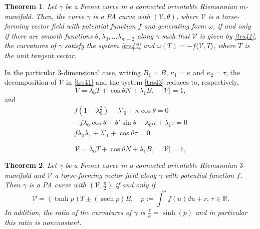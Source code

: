 \documentclass[10pt,a4paper]{amsart}
\newtheorem{theorem}{Theorem}
\def\r{\mathbb R}
\DeclareMathOperator{\sech}{sech}
\def\v{\mathcal V}
\begin{document}
\begin{theorem}\label{prop41}
Let $\gamma $ be a Frenet curve in a connected orientable Riemannian $m$-manifold. Then, the curve $\gamma$ is a PA curve with $(\v,\theta)$, where $\v$ is a torse-forming vector field with potential function $f$ and generating form $\omega$, if and only if there are smooth functions $\theta,\lambda_0,\ldots\lambda_{m-2}$ along $\gamma$ such that $\v$ is given by \eqref{trs41}, the curvatures of $\gamma$ satisfy the system \eqref{trs43} and $\omega(T)=-f\langle \v,T\rangle$, where $T$ is the unit tangent vector.
\end{theorem}

In the particular $3$-dimensional case, writing $B_1=B$, $\kappa_1=\kappa$ and $\kappa_2=\tau$, the decomposition of $\v$ in \eqref{trs41} and the system \eqref{trs43} reduces to, respectively,
\begin{equation}
\v=\lambda_0T+\cos \theta N+\lambda_1 B, \quad |\v |=1, \label{trs44}
\end{equation}
and
\begin{equation}
\left. 
\begin{array}{r}
f(1-\lambda_0^2)-\lambda'_0+ \kappa\cos\theta=0 \\ [4pt]
-f\lambda_0\cos\theta+\theta'\sin \theta-\lambda_0\kappa+\lambda_1\tau=0 \\ [4pt]
f\lambda_0\lambda_{1}+\lambda'_{1}+\cos\theta\tau=0.
\end{array}%
\right. \label{trs45}
\end{equation}

\begin{equation}
\v=\lambda_0T+\cos \theta N+\lambda_1 B, \quad |\v |=1, 
\end{equation}

\begin{theorem}\label{thm42}
Let $\gamma $ be a Frenet curve in a connected orientable Riemannian $3$-manifold and $\v$ a torse-forming vector field along $\gamma$ with potential function $f$. Then $\gamma$ is a PA curve with $(\v,\frac{\pi}{2})$ if and only if 
$$
\v=(\tanh p) T\pm (\sech p) B, \quad p:=\int^s f(u)du+r, \, r\in \r.
$$
In addition, the ratio of the curvatures of $\gamma$ is $\frac{\tau}{\kappa}=\sinh (p)$ and in particular this ratio is nonconstant.
\end{theorem}
\end{document}
